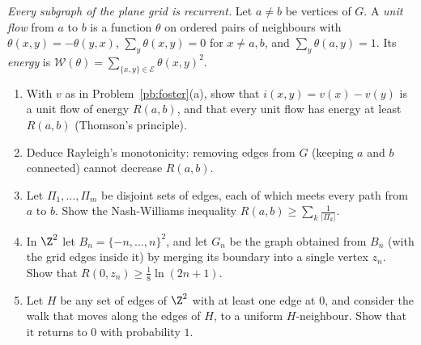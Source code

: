 \begin{exercise}[Journey]\label{pb:rayleigh}
\emph{Every subgraph of the plane grid is recurrent.} Let $a\ne b$ be vertices of $G$. A \emph{unit flow} from $a$ to $b$ is a function $\theta$ on
ordered pairs of neighbours with $\theta(x,y)=-\theta(y,x)$, $\sum_y\theta(x,y)=0$ for $x\ne a,b$, and $\sum_y\theta(a,y)=1$. Its \emph{energy} is
$\mathcal W(\theta)=\sum_{\{x,y\}\in\mathcal E}\theta(x,y)^2$.
\begin{enumerate}[label=(\alph*)]
\item With $v$ as in Problem~\ref{pb:foster}(a), show that $i(x,y)=v(x)-v(y)$ is a unit flow of energy $R(a,b)$, and that every unit flow has energy at least
$R(a,b)$ (Thomson's principle).
\item Deduce Rayleigh's monotonicity: removing edges from $G$ (keeping $a$ and $b$ connected) cannot decrease $R(a,b)$.
\item Let $\Pi_1,\dots,\Pi_m$ be disjoint sets of edges, each of which meets every path from $a$ to $b$. Show the Nash-Williams inequality
$R(a,b)\ge\sum_k\frac1{|\Pi_k|}$.
\item In $\Z^2$ let $B_n=\{-n,\dots,n\}^2$, and let $G_n$ be the graph obtained from $B_n$ (with the grid edges inside it) by merging its boundary into a
single vertex $z_n$. Show that $R(0,z_n)\ge\frac18\ln(2n+1)$.
\item Let $H$ be any set of edges of $\Z^2$ with at least one edge at $0$, and consider the walk that moves along the edges of $H$, to a
uniform $H$-neighbour. Show that it returns to $0$ with probability $1$.
\end{enumerate}
\end{exercise}

